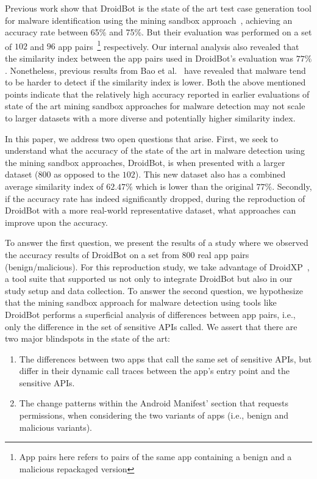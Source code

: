 Previous work show that DroidBot is the state of the art test case generation tool for malware identification using the mining sandbox approach~\cite{DBLP:conf/wcre/BaoLL18,DBLP:journals/jss/CostaMMSSBNR22}, achieving an accuracy rate between 65\% and 75\%. But their evaluation was performed on a set of $102$ and $96$ app pairs~\footnote{App pairs here refers to pairs of the same app containing a benign and a malicious repackaged version} respectively. Our internal analysis also revealed that the similarity index between the app pairs used in DroidBot's evaluation was $77\%$. Nonetheless, previous results from Bao et al.~\cite{DBLP:conf/iceccs/LeB0GL18} %
have revealed that malware tend to be harder to detect if the similarity index is lower. Both the above mentioned points indicate that the relatively high accuracy reported in earlier evaluations of state of the art mining sandbox approaches for malware detection may not scale to larger datasets with a more diverse and potentially higher similarity index.

In this paper, we address two open questions that arise. First, we seek to understand what the accuracy of the state of the art in malware detection using the mining sandbox approaches, DroidBot, is when presented with a larger dataset ($800$ as opposed to the $102$). This new dataset also has a combined average similarity index of $62.47\%$ which is lower than the original $77\%$. Secondly, if the accuracy rate has indeed significantly dropped, during the reproduction of DroidBot with a more real-world representative dataset, what approaches can improve upon the accuracy. 

To answer the first question, we present the results of a study where we observed the accuracy results of DroidBot on a set from $800$ real app pairs (benign/malicious). For this reproduction study, we take advantage of DroidXP~\cite{DBLP:conf/scam/CostaMCMVBC20}, a tool suite that supported us not only to integrate DroidBot but also in our study setup and data collection. To answer the second question, we hypothesize that the mining sandbox approach for malware detection using tools like DroidBot performs a superficial analysis of differences between app pairs, i.e., only the difference in the set of sensitive APIs called. We assert that there are two major blindspots in the state of the art:

\begin{enumerate}
    \item The differences between two apps that call the same set of sensitive APIs, but differ in their dynamic call traces between the app's entry point and the sensitive APIs.
    \item The {\color{blue}change patterns} within the Android Manifest' section that requests permissions, when considering the two variants of apps (i.e., benign and malicious variants).
\end{enumerate}

